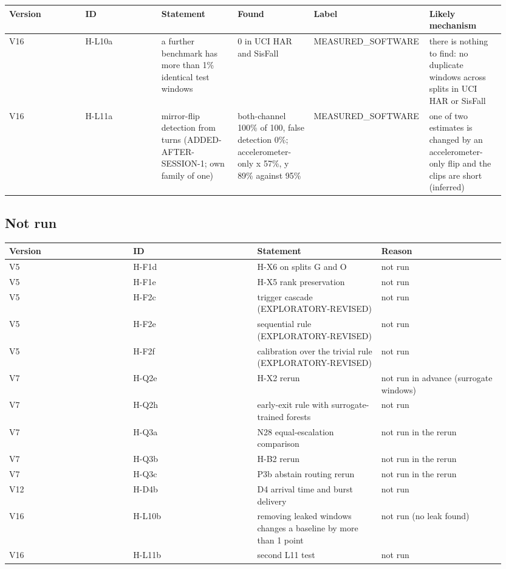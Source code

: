{\scriptsize\raggedright
\begin{longtable}{p{0.158\linewidth}p{0.158\linewidth}p{0.158\linewidth}p{0.158\linewidth}p{0.158\linewidth}p{0.158\linewidth}}
\toprule
Version & ID & Statement & Found & Label & Likely mechanism \\
\midrule
\endhead
V16 & H-L10a & a further benchmark has more than 1\% identical test windows & 0 in UCI HAR and SisFall & MEASURED\_SOFTWARE & there is nothing to find: no duplicate windows across splits in UCI HAR or SisFall \\
V16 & H-L11a & mirror-flip detection from turns (ADDED-AFTER-SESSION-1; own family of one) & both-channel 100\% of 100, false detection 0\%; accelerometer-only x 57\%, y 89\% against 95\% & MEASURED\_SOFTWARE & one of two estimates is changed by an accelerometer-only flip and the clips are short (inferred) \\
\bottomrule
\end{longtable}}

\subsection*{Not run}

{\scriptsize\raggedright
\begin{longtable}{p{0.237\linewidth}p{0.237\linewidth}p{0.237\linewidth}p{0.237\linewidth}}
\toprule
Version & ID & Statement & Reason \\
\midrule
\endhead
V5 & H-F1d & H-X6 on splits G and O & not run \\
V5 & H-F1e & H-X5 rank preservation & not run \\
V5 & H-F2c & trigger cascade (EXPLORATORY-REVISED) & not run \\
V5 & H-F2e & sequential rule (EXPLORATORY-REVISED) & not run \\
V5 & H-F2f & calibration over the trivial rule (EXPLORATORY-REVISED) & not run \\
V7 & H-Q2e & H-X2 rerun & not run in advance (surrogate windows) \\
V7 & H-Q2h & early-exit rule with surrogate-trained forests & not run \\
V7 & H-Q3a & N28 equal-escalation comparison & not run in the rerun \\
V7 & H-Q3b & H-B2 rerun & not run in the rerun \\
V7 & H-Q3c & P3b abstain routing rerun & not run in the rerun \\
V12 & H-D4b & D4 arrival time and burst delivery & not run \\
V16 & H-L10b & removing leaked windows changes a baseline by more than 1 point & not run (no leak found) \\
V16 & H-L11b & second L11 test & not run \\
\bottomrule
\end{longtable}}

